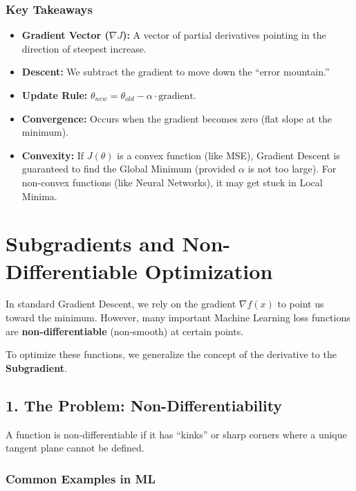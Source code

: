 \documentclass[
  italian,
  11pt,
]{article}
\begin{document}
\subsubsection{Key Takeaways}\label{key-takeaways-12}

\begin{itemize}
\item
  \textbf{Gradient Vector (\(\nabla J\)):} A vector of partial
  derivatives pointing in the direction of steepest increase.
\item
  \textbf{Descent:} We subtract the gradient to move down the ``error
  mountain.''
\item
  \textbf{Update Rule:}
  \(\theta_{new} = \theta_{old} - \alpha \cdot \text{gradient}\).
\item
  \textbf{Convergence:} Occurs when the gradient becomes zero (flat
  slope at the minimum).
\item
  \textbf{Convexity:} If \(J(\theta)\) is a convex function (like MSE),
  Gradient Descent is guaranteed to find the Global Minimum (provided
  \(\alpha\) is not too large). For non-convex functions (like Neural
  Networks), it may get stuck in Local Minima.

  \newpage
\end{itemize}

\section{Subgradients and Non-Differentiable
Optimization}\label{subgradients-and-non-differentiable-optimization}

In standard Gradient Descent, we rely on the gradient \(\nabla f(x)\) to
point us toward the minimum. However, many important Machine Learning
loss functions are \textbf{non-differentiable} (non-smooth) at certain
points.

To optimize these functions, we generalize the concept of the derivative
to the \textbf{Subgradient}.

\subsection{1. The Problem:
Non-Differentiability}\label{the-problem-non-differentiability}

A function is non-differentiable if it has ``kinks'' or sharp corners
where a unique tangent plane cannot be defined.

\subsubsection{Common Examples in ML}\label{common-examples-in-ml}
\end{document}
